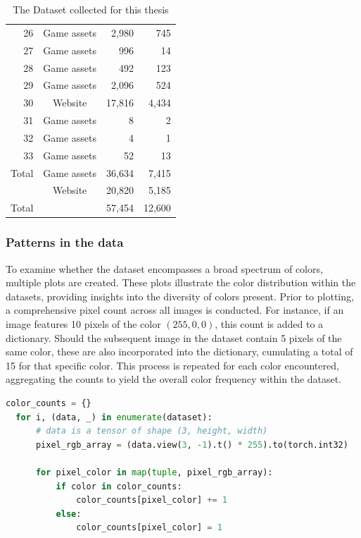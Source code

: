 \begin{table}[H]
\begin{adjustbox}{width=0.8\textwidth}
\begin{tabular}{|r|c|r|r|}
              26 & Game assets & 2,980 & 745 \\
              27 & Game assets & 996 & 14 \\
              28 & Game assets & 492 & 123 \\
              29 & Game assets & 2,096 & 524 \\
              30 & Website & 17,816 & 4,434 \\
              31 & Game assets & 8 & 2 \\
              32 & Game assets & 4 & 1 \\
              33 & Game assets & 52 & 13 \\
              \hline
              Total & Game assets & 36,634 & 7,415 \\
                    & Website & 20,820 & 5,185 \\
              \hline
              Total & & 57,454 & 12,600 \\
              \hline
          \end{tabular}
        \end{adjustbox}
        \caption{The Dataset collected for this thesis}
        \label{tab:datasets}
    \end{table}

    \subsubsection{Patterns in the data}
    
    To examine whether the dataset encompasses a broad spectrum of colors, multiple plots are created. These plots illustrate the color distribution within the datasets, providing insights into the diversity of colors present. Prior to plotting, a comprehensive pixel count across all images is conducted. For instance, if an image features 10 pixels of the color $(255, 0, 0)$, this count is added to a dictionary. Should the subsequent image in the dataset contain 5 pixels of the same color, these are also incorporated into the dictionary, cumulating a total of 15 for that specific color. This process is repeated for each color encountered, aggregating the counts to yield the overall color frequency within the dataset.

\begin{lstlisting}[language=Python]
  color_counts = {} 
  for i, (data, _) in enumerate(dataset):
      # data is a tensor of shape (3, height, width) 
      pixel_rgb_array = (data.view(3, -1).t() * 255).to(torch.int32)
      
      for pixel_color in map(tuple, pixel_rgb_array):
          if color in color_counts:
              color_counts[pixel_color] += 1
          else:
              color_counts[pixel_color] = 1
\end{lstlisting}

